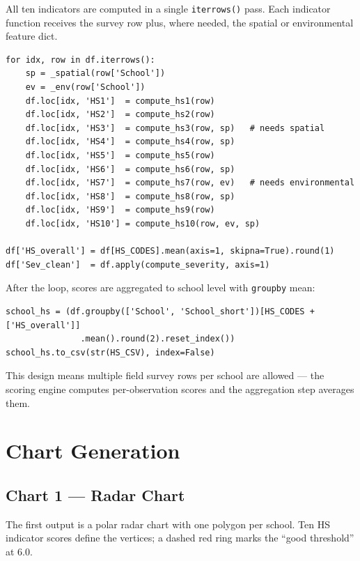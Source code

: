 \documentclass[11pt,a4paper,openany]{book}
\begin{document}
All ten indicators are computed in a single \texttt{iterrows()} pass.
Each indicator function receives the survey row plus, where needed, the spatial
or environmental feature dict.

\begin{lstlisting}[style=python, caption={Per-row HS scoring loop in main.py.}]
for idx, row in df.iterrows():
    sp = _spatial(row['School'])
    ev = _env(row['School'])
    df.loc[idx, 'HS1']  = compute_hs1(row)
    df.loc[idx, 'HS2']  = compute_hs2(row)
    df.loc[idx, 'HS3']  = compute_hs3(row, sp)   # needs spatial
    df.loc[idx, 'HS4']  = compute_hs4(row, sp)
    df.loc[idx, 'HS5']  = compute_hs5(row)
    df.loc[idx, 'HS6']  = compute_hs6(row, sp)
    df.loc[idx, 'HS7']  = compute_hs7(row, ev)   # needs environmental
    df.loc[idx, 'HS8']  = compute_hs8(row, sp)
    df.loc[idx, 'HS9']  = compute_hs9(row)
    df.loc[idx, 'HS10'] = compute_hs10(row, ev, sp)

df['HS_overall'] = df[HS_CODES].mean(axis=1, skipna=True).round(1)
df['Sev_clean']  = df.apply(compute_severity, axis=1)
\end{lstlisting}

After the loop, scores are aggregated to school level with \texttt{groupby} mean:

\begin{lstlisting}[style=python, caption={School-level aggregation and CSV export.}]
school_hs = (df.groupby(['School', 'School_short'])[HS_CODES + ['HS_overall']]
               .mean().round(2).reset_index())
school_hs.to_csv(str(HS_CSV), index=False)
\end{lstlisting}

This design means multiple field survey rows per school are allowed --- the scoring
engine computes per-observation scores and the aggregation step averages them.

\section{Chart Generation}

\subsection{Chart 1 --- Radar Chart}

The first output is a polar radar chart with one polygon per school.
Ten HS indicator scores define the vertices; a dashed red ring marks the
``good threshold'' at 6.0.
\end{document}
